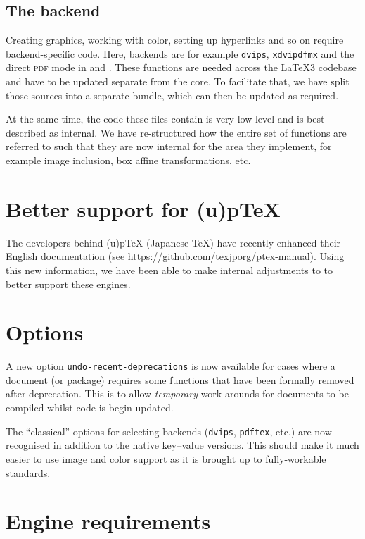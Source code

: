 \documentclass{ltnews}
\begin{document}
\subsection{The backend}

Creating graphics, working with color, setting up hyperlinks and so on require
backend-specific code. Here, backends are for example \texttt{dvips},
\texttt{xdvipdfmx} and the direct \textsc{pdf} mode in  and
. These functions are needed across the \LaTeX3 codebase and
have to be updated separate from the  core. To facilitate that, we
have split those sources into a separate bundle, which can then be updated as
required.

At the same time, the code these files contain is very low-level and is best
described as internal. We have re-structured how the entire set of functions
are referred to such that they are now internal for the area they implement,
for example image inclusion, box affine transformations, etc.

\section{Better support for (u)p\TeX{}}

The developers behind (u)p\TeX{} (Japanese \TeX{}) have recently enhanced their
English documentation (see \url{https://github.com/texjporg/ptex-manual}).
Using this new information, we have been able to make internal adjustments to
 to better support these engines.

\section{Options}

A new option \texttt{undo-recent-deprecations} is now available for cases where
a document (or package) requires some  functions that have been
formally removed after deprecation. This is to allow \emph{temporary}
work-arounds for documents to be compiled whilst code is begin updated.

The \enquote{classical} options for selecting backends (\texttt{dvips},
\texttt{pdftex}, etc.) are now recognised in addition to the native key--value
versions. This should make it much easier to use  image and color
support as it is brought up to fully-workable standards.

\section{Engine requirements}
\end{document}
